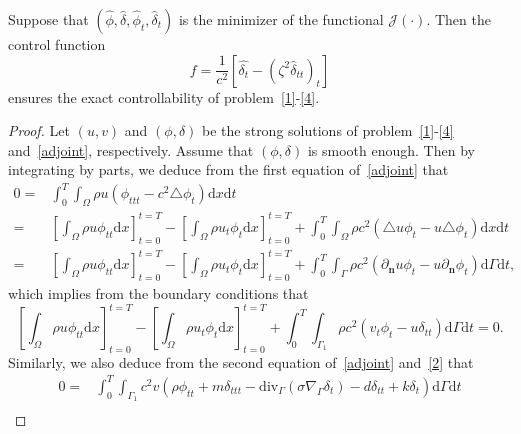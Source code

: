 \documentclass[10pt,a4paper]{amsart}
\begin{document}
\begin{theorem}\label{controllability}
Suppose that $(\hat{\phi}, \hat{\delta}, \hat{\phi}_t, \hat{\delta}_t)$ is the minimizer of the functional $\mathcal{J}(\cdot)$. Then the control function 
\[
f = \frac{1}{c^2}\left[\hat{\delta_t} - (\zeta^2\hat{\delta}_{tt})_t\right]
\]
ensures the exact controllability of problem~\eqref{1}-\eqref{4}.
\end{theorem}

\begin{proof}
Let $(u, v)$ and $(\phi, \delta)$ be the strong solutions of problem~\eqref{1}-\eqref{4} and~\eqref{adjoint}, respectively. Assume that $(\phi, \delta)$ is smooth enough. Then by integrating by parts, we deduce from the first equation of~\eqref{adjoint} that
\begin{equation*}
\begin{split}
0=&\int_{0}^{T}\int_{\Omega}\rho u\left( {\phi}_{ttt} - c^2\triangle{\phi_t}\right)\mathrm{d}x \mathrm{d}t\\
=&\left[\int_{\Omega}\rho u {\phi}_{tt} \mathrm{d}x\right]_{t=0}^{t=T} - \left[\int_{\Omega}\rho u_{t} {\phi_t}\mathrm{d}x \right]_{t=0}^{t=T} + \int_{0}^{T}\int_{\Omega}\rho c^2\left( \triangle u{\phi_t} - u\triangle{\phi_t}\right)\mathrm{d}x \mathrm{d}t\\
=&\left[\int_{\Omega}\rho u {\phi}_{tt} \mathrm{d}x\right]_{t=0}^{t=T} - \left[\int_{\Omega}\rho u_{t} {\phi_t}\mathrm{d}x \right]_{t=0}^{t=T} + \int_{0}^{T}\int_{\Gamma}\rho c^2 \left(\partial_{\mathbf{n}}u{\phi_t} - u\partial_{\mathbf{n}}{\phi_t} \right) \mathrm{d}\Gamma \mathrm{d}t,
\end{split}
\end{equation*}
which implies from the boundary conditions that
\begin{equation} \label{explicit_1}
\left[\int_{\Omega}\rho u {\phi}_{tt} \mathrm{d}x\right]_{t=0}^{t=T} - \left[\int_{\Omega}\rho u_{t} {\phi_t}\mathrm{d}x \right]_{t=0}^{t=T} + \int_{0}^{T}\int_{\Gamma_1}\rho c^2 \left(v_{t}{\phi_t} - u{\delta}_{tt} \right) \mathrm{d}\Gamma \mathrm{d}t=0.
\end{equation}
Similarly, we also deduce from the second equation of~\eqref{adjoint} and~\eqref{2} that
\begin{equation}\label{explicit_2}
\begin{split}
0=&\int_{0}^{T}\int_{\Gamma_1}c^{2}v\left( \rho {\phi}_{tt} + m {\delta}_{ttt} - \mathrm{div}_{\Gamma}\left(\sigma\nabla_{\Gamma} {\delta_t}\right) - d {\delta}_{tt} + k {\delta_t} \right)\mathrm{d}\Gamma \mathrm{d}t\\

\end{split}
\end{equation}
\end{proof}
\end{document}
